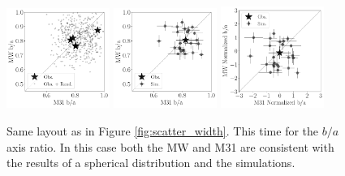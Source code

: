 \documentclass[a4paper,fleqn,usenatbib]{mnras}
\begin{document}
\begin{figure}
\centering
\includegraphics[width=0.30\textwidth]{scatter_random_ranked_ba_ratio.pdf}
\includegraphics[width=0.30\textwidth]{scatter_ranked_illudm_ba_ratio.pdf}
\includegraphics[width=0.30\textwidth]{scatter_norm_ranked_illudm_ba_ratio.pdf}
\caption{Same layout as in Figure \ref{fig:scatter_width}. 
This time for the $b/a$ axis ratio. In this case both the MW and M31
are consistent with the results of a spherical distribution and 
the simulations. 
\label{fig:scatter_ba_ratio}}
\end{figure}
\end{document}
